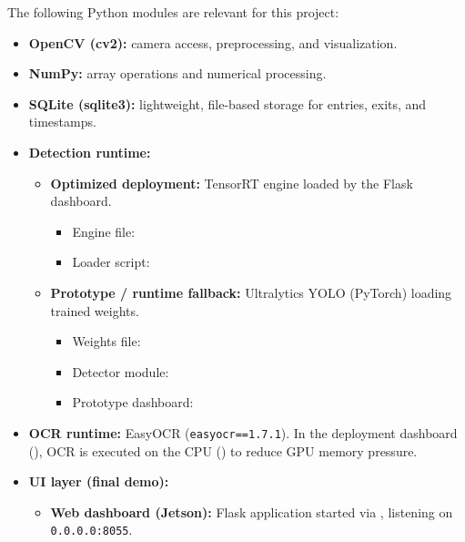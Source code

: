 \vspace{1mm}
\noindent
The following Python modules are relevant for this project:
\begin{itemize}
	\item \textbf{OpenCV (cv2):} camera access, preprocessing, and visualization.
	\item \textbf{NumPy:} array operations and numerical processing.
	\item \textbf{SQLite (sqlite3):} lightweight, file-based storage for entries, exits, and timestamps.
	
	\item \textbf{Detection runtime:}
	\begin{itemize}
		\item \textbf{Optimized deployment:}  
		TensorRT engine loaded by the Flask dashboard.
		
		{\sloppy\small
			\begin{itemize}
				\item Engine file: 
				\item Loader script: 
			\end{itemize}
		}
		
		\item \textbf{Prototype / runtime fallback:}  
		Ultralytics YOLO (PyTorch) loading trained weights.
		
		{\sloppy\small
			\begin{itemize}
				\item Weights file: 
				\item Detector module: 
				\item Prototype dashboard: 
			\end{itemize}
		}
	\end{itemize}
	
	\item \textbf{OCR runtime:}  
	EasyOCR (\texttt{easyocr==1.7.1}).  
	In the deployment dashboard (), OCR is executed on the CPU
	() to reduce GPU memory pressure.
	
	\item \textbf{UI layer (final demo):}
	\begin{itemize}
		\item \textbf{Web dashboard (Jetson):}  
		Flask application started via , listening on
		\texttt{0.0.0.0:8055}.
		

\end{itemize}
\end{itemize}
